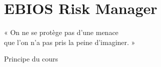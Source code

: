 
\chapter{EBIOS Risk Manager}
\label{chap:ebios}

\epigraph{%
    « On ne se protège pas d'une menace\\
    que l'on n'a pas pris la peine d'imaginer. »%
}{Principe du cours}



